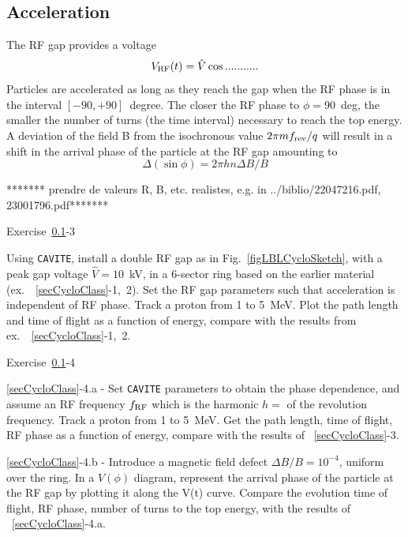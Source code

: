 \subsection{Acceleration}\label{secCycloAccel}


The RF gap provides a voltage  
\begin{equation}
\label{EqRCyclo}
V_{\rm RF}(t) =\hat V \cos ........... 
\end{equation}
Particles are accelerated as long as they reach the gap when the RF phase is in the 
interval $[-90,+90]$~degree. 
The closer the RF phase to $\phi=90$~deg, the smaller the number of turns 
(the time interval) necessary to reach the top energy. 
A deviation of the field B from the isochronous value $2\pi m f_{\rm rev}/q$
will result in a  shift in the arrival phase of the particle at the RF gap amounting to 
\begin{equation}
\label{EqPFPhaseCyclo}
\Delta (\sin \phi) = 2\pi h n \Delta B/B
\end{equation}

 ******* prendre de valeurs R, B, etc. realistes, e.g. in ../biblio/22047216.pdf, 23001796.pdf*******

\smallskip
\noindent {\small $\bullet$} Exercise~\ref{secCycloAccel}-3 

Using \texttt{CAVITE}, install a double RF gap as in Fig.~\ref{figLBLCycloSketch}, 
with a peak gap voltage $\hat V = 10$~kV, in a 6-sector ring based on the earlier material (ex.~~\ref{secCycloClass}-1,~2). 
Set the RF gap parameters such that acceleration is independent of RF phase.
Track a proton from 1 to 5~MeV. Plot the path length and time of flight as a function of energy, 
compare with the results from ex.~~\ref{secCycloClass}-1,~2.


\smallskip
\noindent {\small $\bullet$} Exercise~\ref{secCycloAccel}-4 

\noindent \ref{secCycloClass}-4.a - 
Set \texttt{CAVITE} parameters to obtain the phase dependence, 
and assume an RF frequency $f_{\rm RF}$ which is the harmonic $h=$ of the revolution frequency.
Track a proton from 1 to 5~MeV. 
Get the path length, time of flight, RF phase as a function of energy,
compare with the results of ~\ref{secCycloClass}-3.

\noindent \ref{secCycloClass}-4.b - 
Introduce a magnetic field defect $\Delta B/B= 10^{-4}$, uniform over the ring. 
In a $V(\phi)$ diagram, represent  the arrival phase  of the particle at the RF gap
by plotting it along the V(t) curve. 
Compare the evolution time of flight, RF phase, number of turns to the top energy,
 with the results of ~\ref{secCycloClass}-4.a.




